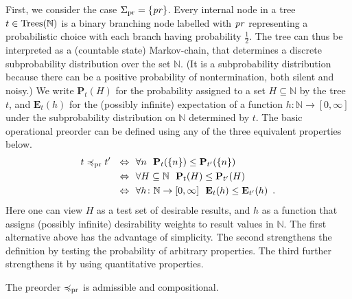 First, we  consider the case $\Sigma_{\text{pr}} = \{\operatorname{\mathit{pr}}\}$. Every internal node in a  tree $t \in \textnormal{Trees}(\mathbb{N})$  is a binary branching node labelled with $\operatorname{\mathit{pr}}$ representing a probabilistic choice with each branch having probability $\frac{1}{2}$. The tree can thus be interpreted as a (countable state) Markov-chain, that determines a discrete subprobability distribution over the set $\mathbb{N}$.
(It is a subprobability distribution because there can be a positive probability of nontermination, both silent and noisy.) We write
$\mathbf{P}_t (H)$ for the probability assigned to a set $H \subseteq \mathbb{N}$
by the tree $t$, and $\mathbf{E}_t (h)$ for the (possibly infinite) expectation of a function $h\colon \mathbb{N} \to [0,\infty]$ under the subprobability distribution on $\mathbb{N}$ determined by $t$.
The basic operational preorder can be defined using any of the three equivalent properties below.
\begin{align*}
t \preccurlyeq_{\text{pr}} t' ~~ \Leftrightarrow ~~ &  \forall n ~ ~ \mathbf{P}_t (\{n\}) \leq \mathbf{P}_{t'}(\{n\})  \\
 ~ \Leftrightarrow ~~ & \forall H \subseteq \mathbb{N} ~~ \mathbf{P}_t (H) \leq \mathbf{P}_{t'}(H) \\
 ~ \Leftrightarrow ~~ & \forall h\colon \mathbb{N} \to [0,\infty] ~~ \mathbf{E}_t (h) \leq \mathbf{E}_{t'}(h) \enspace .
\end{align*}
Here one can view $H$ as a test set of desirable results, and $h$ as a function that assigns (possibly infinite) desirability weights 
to result values in $\mathbb{N}$. The first alternative above has the advantage of simplicity. The second strengthens the definition by testing the probability of arbitrary properties. The third further strengthens it by using quantitative properties.
\begin{proposition}
The preorder $\preccurlyeq_{\text{pr}}$ is admissible and compositional. 
\end{proposition}

